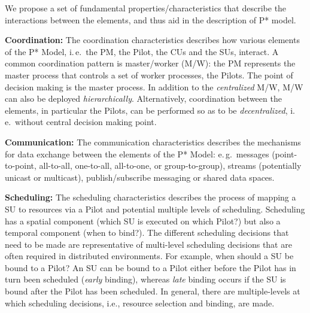 \documentclass[conference,final]{IEEEtran}
\newcommand{\jhanote}[1]{ {\textcolor{red} { ***shantenu: #1 }}}
\newcommand{\alnote}[1]{ {\textcolor{blue} { ***andreL: #1 }}}
\newcommand{\alnote}[1]{}
\newcommand{\jhanote}[1]{}
\newcommand{\pilot}{Pilot\xspace}
\newcommand{\pilots}{Pilots\xspace}
\newcommand{\cus}{CUs\xspace}
\begin{document}

 
We propose a set of fundamental properties/characteristics that
describe the interactions between the elements, and thus aid in the
description of P* model.


\textbf{Coordination:} The coordination characteristics describes how
various elements of the P* Model, i.\,e.\ the PM, the \pilot, the \cus
and the SUs, interact. A common coordination pattern is master/worker
(M/W): the PM represents the master process that controls a set of
worker processes, the \pilots. The point of decision making is the
master process. In addition to the \emph{centralized} M/W, M/W can
also be deployed \emph{hierarchically}.  Alternatively, coordination
between the elements, in particular the \pilots, can be performed so as
to be \emph{decentralized}, i.\,e.\ without central decision making
point.

%

\textbf{Communication:} The communication characteristics describes the
mechanisms for data exchange between the elements of the P* Model:
e.\,g.\ messages (point-to-point, all-to-all, one-to-all, all-to-one,
or group-to-group), streams (potentially unicast or multicast),
publish/subscribe messaging or shared data spaces.
		
\textbf{Scheduling:} The scheduling characteristics describes the
process of mapping a SU to resources via a \pilot and potential
multiple levels of scheduling. Scheduling has a spatial component
(which SU is executed on which \pilot?) but also a temporal component
(when to bind?). The different scheduling decisions that need to be
made are representative of multi-level scheduling decisions that are
often required in distributed environments.  For example, when should
a SU be bound to a \pilot?  An SU can be bound to a \pilot either before
the \pilot has in turn been scheduled ({\it early} binding), whereas
{\it late} binding occurs if the SU is bound after the \pilot has been
scheduled.  In general, there are multiple-levels at which scheduling
decisions, i.e., resource selection and binding, are made.
\end{document}
